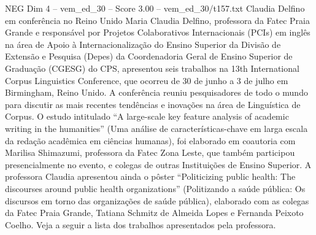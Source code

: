 \begin{textsample}{NEG Dim 4 – vem\_ed\_30 – Score 3.00 – vem\_ed\_30/t157.txt}  \label{ex:f4_neg_101}
Claudia Delfino em conferência no Reino Unido Maria Claudia Delfino, professora da Fatec Praia Grande e responsável por Projetos Colaborativos Internacionais (PCIs) em inglês na área de Apoio à Internacionalização do Ensino Superior da Divisão de Extensão e Pesquisa (Depes) da Coordenadoria Geral de Ensino Superior de Graduação (CGESG) do CPS, apresentou seis trabalhos na 13th International Corpus Linguistics Conference, que ocorreu de 30 de junho a 3 de julho em Birmingham, Reino Unido.
A conferência reuniu pesquisadores de todo o mundo para discutir as mais recentes tendências e inovações na área de Linguística de Corpus.
O estudo intitulado “A large-scale key feature analysis of academic writing in the humanities” (Uma análise de características-chave em larga escala da redação acadêmica em ciências humanas), foi elaborado em coautoria com Marilisa Shimazumi, professora da Fatec Zona Leste, que também participou presencialmente no evento, e colegas de outras Instituições de Ensino Superior.
A professora Claudia apresentou ainda o pôster “Politicizing public health: The discourses around public health organizations” (Politizando a saúde pública: Os discursos em torno das organizações de saúde pública), elaborado com as colegas da Fatec Praia Grande, Tatiana Schmitz de Almeida Lopes e Fernanda Peixoto Coelho.
Veja a seguir a lista dos trabalhos apresentados pela professora.

\end{textsample}
